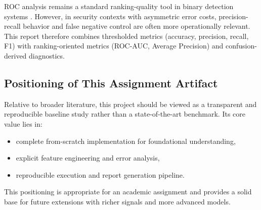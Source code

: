 ROC analysis remains a standard ranking-quality tool in binary detection systems \cite{fawcett2006roc}. However, in security contexts with asymmetric error costs, precision-recall behavior and false negative control are often more operationally relevant. This report therefore combines thresholded metrics (accuracy, precision, recall, F1) with ranking-oriented metrics (ROC-AUC, Average Precision) and confusion-derived diagnostics.

\subsection{Positioning of This Assignment Artifact}

Relative to broader literature, this project should be viewed as a transparent and reproducible baseline study rather than a state-of-the-art benchmark. Its core value lies in:
\begin{itemize}
    \item complete from-scratch implementation for foundational understanding,
    \item explicit feature engineering and error analysis,
    \item reproducible execution and report generation pipeline.
\end{itemize}

This positioning is appropriate for an academic assignment and provides a solid base for future extensions with richer signals and more advanced models.
